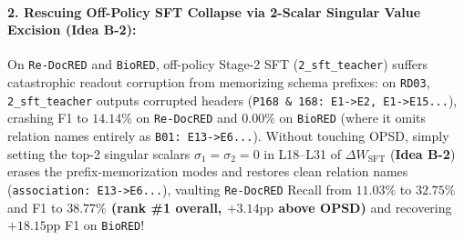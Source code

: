 \documentclass[11pt,a4paper]{article}
\begin{document}
\paragraph{2. Rescuing Off-Policy SFT Collapse via 2-Scalar Singular Value Excision (\textbf{Idea B-2}):}
On \texttt{Re-DocRED} and \texttt{BioRED}, off-policy Stage-2 SFT (\texttt{2\_sft\_teacher}) suffers catastrophic readout corruption from memorizing schema prefixes: on \texttt{RD03}, \texttt{2\_sft\_teacher} outputs corrupted headers (\texttt{P168 \& 168: E1->E2, E1->E15...}), crashing F1 to $14.14\%$ on \texttt{Re-DocRED} and $0.00\%$ on \texttt{BioRED} (where it omits relation names entirely as \texttt{B01: E13->E6...}). Without touching OPSD, simply setting the top-2 singular scalars $\sigma_1=\sigma_2=0$ in L18--L31 of $\Delta W_{\text{SFT}}$ (\textbf{Idea B-2}) erases the prefix-memorization modes and restores clean relation names (\texttt{association: E13->E6...}), vaulting \texttt{Re-DocRED} Recall from $11.03\%$ to \textbf{$32.75\%$} and F1 to \textbf{$38.77\%$ (rank \#1 overall, $+3.14\text{pp}$ above OPSD)} and recovering $+18.15\text{pp}$ F1 on \texttt{BioRED}!
\end{document}
